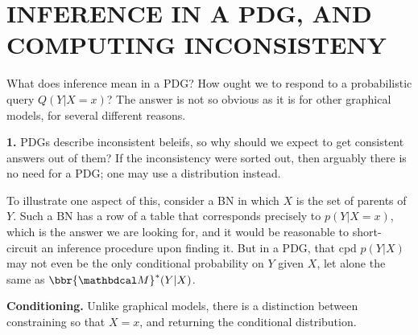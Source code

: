 \documentclass[twoside]{article}
\begin{document}
\section{INFERENCE IN A PDG, AND COMPUTING INCONSISTENY}

What does inference mean in a PDG?
How ought we to respond to a probabilistic query $Q(Y|X{=}x)$?
The answer is not so obvious as it is for other graphical models,
for several different reasons.

\textbf{1.}
PDGs describe inconsistent beleifs,
so why should we expect to get consistent answers out of them?
If the inconsistency were sorted out, then arguably there is no need for a PDG; one may use a distribution instead.

To illustrate one aspect of this, consider a BN in which $X$ is the set of parents of $Y$.
Such a BN has a row of a table that corresponds precisely to $p(Y|X{=}x)$, which is the answer we are looking for, and it would be reasonable to short-circuit an inference procedure upon finding it.
But in a PDG, that cpd $p(Y | X)$ may not even be the only conditional probability on $Y$ given $X$, let alone the same as $\bbr{\dg M}^*(Y|X)$.

\textbf{Conditioning.}
Unlike graphical models,
there is a distinction between constraining so that $X{=}x$,
and returning the conditional distribution.
\end{document}
